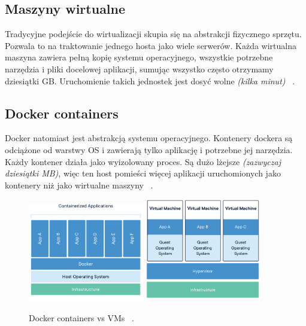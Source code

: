 \subsection{Maszyny wirtualne}

Tradycyjne podejście do wirtualizacji skupia się na abstrakcji fizycznego sprzętu. 
Pozwala to na traktowanie jednego hosta jako wiele serwerów. 
Każda wirtualna maszyna zawiera pełną kopię systemu operacyjnego, wszystkie potrzebne narzędzia i pliki docelowej aplikacji, sumując wszystko często otrzymamy dziesiątki GB.
Uruchomienie takich jednostek jest dosyć wolne {\em (kilka minut)} ~\cite{docker-c}.
    
\subsection{Docker containers}

Docker natomiast jest abstrakcją systemu operacyjnego. Kontenery dockera są odciążone od warstwy OS i zawierają tylko aplikację i potrzebne jej narzędzia.
Każdy kontener działa jako wyizolowany proces. Są dużo lżejsze {\em (zazwyczaj dziesiątki MB)}, 
więc ten host pomieści więcej aplikacji uruchomionych jako kontenery niż jako wirtualne maszyny ~\cite{docker-c}.

\begin{figure}[h!]
	\begin{center}
		\includegraphics[width=0.45\textwidth]{img/docker-layers}
		\hspace{5mm}
		\includegraphics[width=0.45\textwidth]{img/vm-layers}
	\end{center}
	\caption{Docker containers vs VMs ~\cite{docker-c}.}
	\label{fig:docker-vms}
\end{figure}

